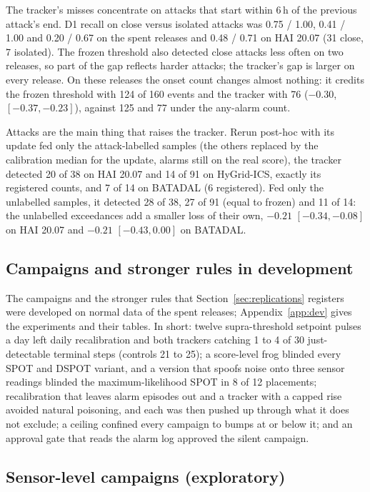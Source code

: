 \documentclass[letterpaper,twocolumn,10pt]{article}
\begin{document}
The tracker's misses concentrate on attacks that start within 6\,h of the previous attack's end. D1
recall on close versus isolated attacks was 0.75 / 1.00, 0.41 / 1.00 and 0.20 / 0.67 on the spent
releases and 0.48 / 0.71 on HAI 20.07 (31 close, 7 isolated). The frozen threshold also detected
close attacks less often on two releases, so part of the gap reflects harder attacks; the tracker's
gap is larger on every release. On these releases the onset count changes almost nothing: it credits
the frozen threshold with 124 of 160 events and the tracker with 76 ($-0.30$, $[-0.37, -0.23]$),
against 125 and 77 under the any-alarm count.

Attacks are the main thing that raises the tracker. Rerun post-hoc with its update fed only the
attack-labelled samples (the others replaced by the calibration median for the update, alarms still on
the real score), the tracker detected 20 of 38 on HAI 20.07 and 14 of 91 on HyGrid-ICS, exactly its
registered counts, and 7 of 14 on BATADAL (6 registered). Fed only the unlabelled samples, it detected
28 of 38, 27 of 91 (equal to frozen) and 11 of 14: the unlabelled exceedances add a smaller loss of
their own, $-0.21$ $[-0.34, -0.08]$ on HAI 20.07 and $-0.21$ $[-0.43, 0.00]$ on BATADAL.

\subsection{Campaigns and stronger rules in development}
\label{sec:devsummary}

The campaigns and the stronger rules that Section~\ref{sec:replications} registers were developed on
normal data of the spent releases; Appendix~\ref{app:dev} gives the experiments and their tables. In
short: twelve supra-threshold setpoint pulses a day left daily recalibration and both trackers catching
1 to 4 of 30 just-detectable terminal steps (controls 21 to 25); a score-level frog blinded every SPOT
and DSPOT variant, and a version that spoofs noise onto three sensor readings blinded the
maximum-likelihood SPOT in 8 of 12 placements; recalibration that leaves alarm episodes out and a
tracker with a capped rise avoided natural poisoning, and each was then pushed up through what it does
not exclude; a ceiling confined every campaign to bumps at or below it; and an approval gate that
reads the alarm log approved the silent campaign.

\subsection{Sensor-level campaigns (exploratory)}
\label{sec:process}
\end{document}
